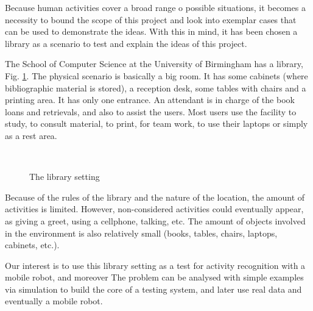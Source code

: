 Because human activities cover a broad range o possible situations, it becomes a necessity to bound the scope of this project and look into exemplar cases that can be used to demonstrate the ideas. 
With this in mind, it has been chosen a library as a scenario to test and explain the ideas of this project.

The School of Computer Science at the University of Birmingham has a library, Fig. \ref{fig_library}.
The physical scenario is basically a big room. 
It has some cabinets (where bibliographic material is stored), a reception desk, some tables with chairs and a printing area. 
It has only one entrance.
An attendant is in charge of the book loans and retrievals, and also to assist the users.
Most users use the facility to study, to consult material, to print, for team work, to use their laptops or simply as a rest area.

\begin{figure}[tbp]
  \centering
  \quad
  \\
  \label{fig_library}\caption{The library setting}
\end{figure}

Because of the rules of the library and the nature of the location, the amount of activities is limited.
However, non-considered activities could eventually appear, as giving a greet, using a cellphone, talking, etc.
The amount of objects involved in the environment is also relatively small (books, tables, chairs, laptops, cabinets, etc.).

Our interest is to use this library setting as a test for activity recognition with a mobile robot, and moreover
The problem can be analysed with simple examples via simulation to build the core of a testing system, and later use real data and eventually a mobile robot.

